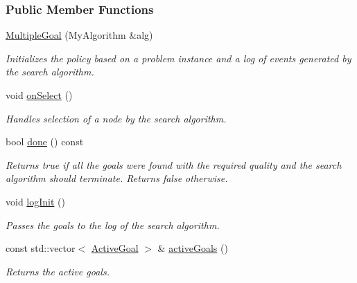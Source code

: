 \subsubsection*{Public Member Functions}
\begin{DoxyCompactItemize}
\item 
\hyperlink{structslb_1_1ext_1_1policy_1_1goalHandler_1_1MultipleGoal_aa9b76021889c35d043f4397a1ab2af4b}{Multiple\+Goal} (My\+Algorithm \&alg)
\begin{DoxyCompactList}\small\item\em Initializes the policy based on a problem instance and a log of events generated by the search algorithm. \end{DoxyCompactList}\item 
void \hyperlink{structslb_1_1ext_1_1policy_1_1goalHandler_1_1MultipleGoal_a642703dd6159fbd718d5866c2174a2da}{on\+Select} ()\hypertarget{structslb_1_1ext_1_1policy_1_1goalHandler_1_1MultipleGoal_a642703dd6159fbd718d5866c2174a2da}{}\label{structslb_1_1ext_1_1policy_1_1goalHandler_1_1MultipleGoal_a642703dd6159fbd718d5866c2174a2da}

\begin{DoxyCompactList}\small\item\em Handles selection of a node by the search algorithm. \end{DoxyCompactList}\item 
bool \hyperlink{structslb_1_1ext_1_1policy_1_1goalHandler_1_1MultipleGoal_ad36967cc738179c041f607450a7c675c}{done} () const 
\begin{DoxyCompactList}\small\item\em Returns {\ttfamily true} if all the goals were found with the required quality and the search algorithm should terminate. Returns {\ttfamily false} otherwise. \end{DoxyCompactList}\item 
void \hyperlink{structslb_1_1ext_1_1policy_1_1goalHandler_1_1MultipleGoal_af4ba551efdf2e82a7dcd42d179a2c5c4}{log\+Init} ()
\begin{DoxyCompactList}\small\item\em Passes the goals to the log of the search algorithm. \end{DoxyCompactList}\item 
const std\+::vector$<$ \hyperlink{structslb_1_1ext_1_1policy_1_1goalHandler_1_1MultipleGoal_ab5c8ba5693e69007544a7e9e4a48f7fa}{Active\+Goal} $>$ \& \hyperlink{structslb_1_1ext_1_1policy_1_1goalHandler_1_1MultipleGoal_a4682263d39e3de328ad041d138f470da}{active\+Goals} ()
\begin{DoxyCompactList}\small\item\em Returns the active goals. \end{DoxyCompactList}\end{DoxyCompactItemize}

